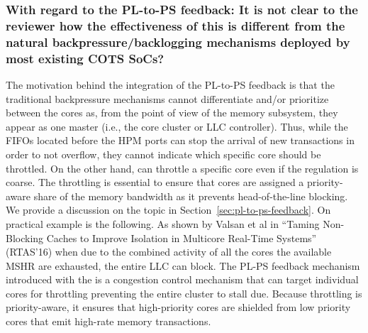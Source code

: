 
        \subsubsection{With regard to the PL-to-PS feedback: It is not
        clear to the reviewer how the effectiveness of this is
        different from the natural backpressure/backlogging mechanisms
        deployed by most existing COTS SoCs?}

        The motivation behind the integration of the PL-to-PS feedback
        is that the traditional backpressure mechanisms cannot
        differentiate and/or prioritize between the cores as, from the
        point of view of the memory subsystem, they appear as one
        master (i.e., the core cluster or LLC controller).  Thus,
        while the FIFOs located before the HPM ports can stop the
        arrival of new transactions in order to not overflow, they
        cannot indicate which specific core should be throttled. On
        the other hand, \schim can throttle a specific core even if
        the regulation is coarse.  The throttling is essential to
        ensure that cores are assigned a priority-aware share of the
        memory bandwidth as it prevents head-of-the-line blocking. We
        provide a discussion on the topic in
        Section~\ref{sec:pl-to-ps-feedback}. On practical example is
        the following. As shown by Valsan et al in ``Taming
        Non-Blocking Caches to Improve Isolation in Multicore
        Real-Time Systems'' (RTAS'16) when due to the combined
        activity of all the cores the available MSHR are exhausted,
        the entire LLC can block. The PL-PS feedback mechanism
        introduced with the \schim is a congestion control mechanism
        that can target individual cores for throttling preventing the
        entire cluster to stall due. Because throttling is
        priority-aware, it ensures that high-priority cores are
        shielded from low priority cores that emit high-rate memory
        transactions.

